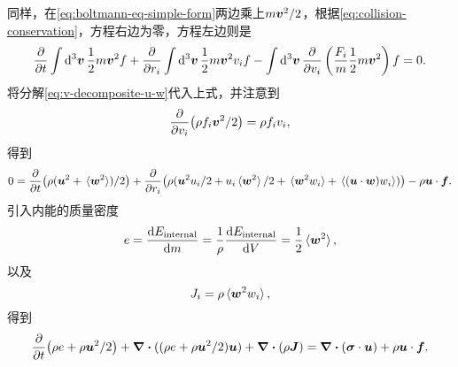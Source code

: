 同样，在\eqref{eq:boltmann-eq-simple-form}两边乘上$m \vb*{v}^2 / 2$，根据\eqref{eq:collision-conservation}，方程右边为零，方程左边则是
\[
    \pdv{t} \int \dd[3]{\vb*{v}} \frac{1}{2} m \vb*{v}^2 f + \pdv{r_i} \int \dd[3]{\vb*{v}} \frac{1}{2} m \vb*{v}^2 v_i f - \int \dd[3]{\vb*{v}} \pdv{v_i} \left( \frac{F_i}{m} \frac{1}{2} m \vb*{v}^2 \right) f = 0.
\]
将分解\eqref{eq:v-decomposite-u-w}代入上式，并注意到
\[
    \pdv{v_i} (\rho f_i \vb*{v}^2 / 2) = \rho f_i v_i,
\]
得到
\[
    0 = \pdv{t} (\rho (\vb*{u}^2 + \expval*{\vb*{w}^2}) / 2) + \pdv{r_i} (\rho (\vb*{u}^2 u_i / 2 + u_i \expval*{\vb*{w}^2} /2 + \expval*{\vb*{w}^2 w_i} + \expval*{(\vb*{u} \cdot \vb*{w}) w_i})) - \rho \vb*{u} \cdot \vb*{f}. 
\]
引入内能的质量密度
\begin{equation}
    e = \dv{E_\text{internal}}{m} = \frac{1}{\rho} \dv{E_\text{internal}}{V} = \frac{1}{2} \expval*{\vb*{w}^2},
\end{equation}
以及
\begin{equation}
    J_i = \rho \expval*{\vb*{w}^2 w_i},
\end{equation}
得到
\begin{equation}
    \pdv{t} (\rho e + \rho \vb*{u}^2 / 2) + \div{((\rho e + \rho \vb*{u}^2 / 2) \vb*{u})} + \div{(\rho \vb*{J})} = \div{(\vb*{\sigma} \cdot \vb*{u})} + \rho \vb*{u} \cdot \vb*{f}.
    \label{eq:continue-energy}
\end{equation}

